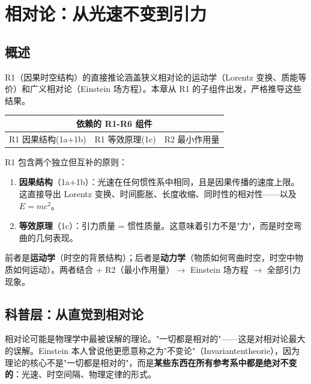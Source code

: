 \chapter{相对论：从光速不变到引力}
\label{ch:relativity}

\section{概述}

R1（因果时空结构）的直接推论涵盖狭义相对论的运动学（Lorentz 变换、质能等价）和广义相对论（Einstein 场方程）。本章从 R1 的子组件出发，严格推导这些结果。

\begin{center}
\small
\begin{tabular}{p{3.5cm}p{3.5cm}p{3cm}}
\toprule
\multicolumn{3}{c}{\textbf{依赖的 R1-R6 组件}} \\
\midrule
R1 因果结构(1a+1b) & R1 等效原理(1c) & R2 最小作用量 \\
\bottomrule
\end{tabular}
\end{center}

\begin{insightbox}
  R1 包含两个独立但互补的原则：
  \begin{enumerate}
    \item \textbf{因果结构}（1a+1b）：光速在任何惯性系中相同，且是因果传播的速度上限。这直接导出 Lorentz 变换、时间膨胀、长度收缩、同时性的相对性——以及 $E=mc^2$。
    \item \textbf{等效原理}（1c）：引力质量 = 惯性质量。这意味着引力不是"力"，而是时空弯曲的几何表现。
  \end{enumerate}
  前者是\textbf{运动学}（时空的背景结构）；后者是\textbf{动力学}（物质如何弯曲时空，时空中物质如何运动）。两者结合 + R2（最小作用量）$\to$ Einstein 场方程 $\to$ 全部引力现象。
\end{insightbox}

\section{科普层：从直觉到相对论}

相对论可能是物理学中最被误解的理论。"一切都是相对的"——这是对相对论最大的误解。Einstein 本人曾说他更愿意称之为"不变论"（Invariantentheorie），因为理论的核心不是"一切都是相对的"，而是\textbf{某些东西在所有参考系中都是绝对不变的}：光速、时空间隔、物理定律的形式。

